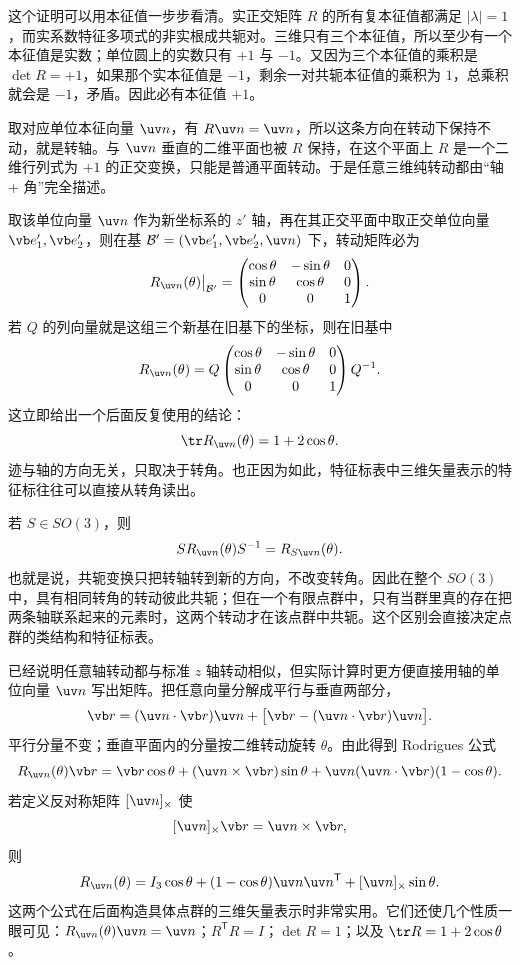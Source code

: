 这个证明可以用本征值一步步看清。实正交矩阵 $R$ 的所有复本征值都满足 $|\lambda|=1$，而实系数特征多项式的非实根成共轭对。三维只有三个本征值，所以至少有一个本征值是实数；单位圆上的实数只有 $+1$ 与 $-1$。又因为三个本征值的乘积是 $\det R=+1$，如果那个实本征值是 $-1$，剩余一对共轭本征值的乘积为 $1$，总乘积就会是 $-1$，矛盾。因此必有本征值 $+1$。

取对应单位本征向量 $\uv n$，有 $R\uv n=\uv n$，所以这条方向在转动下保持不动，就是转轴。与 $\uv n$ 垂直的二维平面也被 $R$ 保持，在这个平面上 $R$ 是一个二维行列式为 $+1$ 的正交变换，只能是普通平面转动。于是任意三维纯转动都由“轴 + 角”完全描述。


取该单位向量 $\uv n$ 作为新坐标系的 $z'$ 轴，再在其正交平面中取正交单位向量 $\vb e_1',\vb e_2'$，则在基 $\mathcal B'=(\vb e_1',\vb e_2',\uv n)$ 下，转动矩阵必为
\[
R_{\uv n}(\theta)\big|_{\mathcal B'}=
\begin{pmatrix}
\cos\theta&-\sin\theta&0\\
\sin\theta&\cos\theta&0\\
0&0&1
\end{pmatrix}.
\]
若 $Q$ 的列向量就是这组三个新基在旧基下的坐标，则在旧基中
\[
R_{\uv n}(\theta)=Q
\begin{pmatrix}
\cos\theta&-\sin\theta&0\\
\sin\theta&\cos\theta&0\\
0&0&1
\end{pmatrix}
Q^{-1}.
\label{eq:axis-angle-similarity}
\]
这立即给出一个后面反复使用的结论：
\[
\tr R_{\uv n}(\theta)=1+2\cos\theta.
\label{eq:rotation-trace}
\]
迹与轴的方向无关，只取决于转角。也正因为如此，特征标表中三维矢量表示的特征标往往可以直接从转角读出。

若 $S\in SO(3)$，则
\[
S R_{\uv n}(\theta)S^{-1}=R_{S\uv n}(\theta).
\label{eq:rotation-conjugation}
\]
也就是说，共轭变换只把转轴转到新的方向，不改变转角。因此在整个 $SO(3)$ 中，具有相同转角的转动彼此共轭；但在一个有限点群中，只有当群里真的存在把两条轴联系起来的元素时，这两个转动才在该点群中共轭。这个区别会直接决定点群的类结构和特征标表。

 已经说明任意轴转动都与标准 $z$ 轴转动相似，但实际计算时更方便直接用轴的单位向量 $\uv n$ 写出矩阵。把任意向量分解成平行与垂直两部分，
\[
\vb r=(\uv n\cdot\vb r)\uv n+
\bigl[\vb r-(\uv n\cdot\vb r)\uv n\bigr].
\]
平行分量不变；垂直平面内的分量按二维转动旋转 $\theta$。由此得到 Rodrigues 公式
\[
R_{\uv n}(\theta)\vb r
=\vb r\cos\theta
+(\uv n\times\vb r)\sin\theta
+\uv n(\uv n\cdot\vb r)(1-\cos\theta).
\label{eq:rodrigues-vector}
\]
若定义反对称矩阵 $[\uv n]_\times$ 使
\[
[\uv n]_\times\vb r=\uv n\times\vb r,
\]
则
\[
R_{\uv n}(\theta)
=I_3\cos\theta
+(1-\cos\theta)\uv n\uv n^{\mathsf T}
+[\uv n]_\times\sin\theta.
\label{eq:rodrigues-matrix}
\]
这两个公式在后面构造具体点群的三维矢量表示时非常实用。它们还使几个性质一眼可见：$R_{\uv n}(\theta)\uv n=\uv n$；$R^{\mathsf T}R=I$；$\det R=1$；以及 $\tr R=1+2\cos\theta$。

